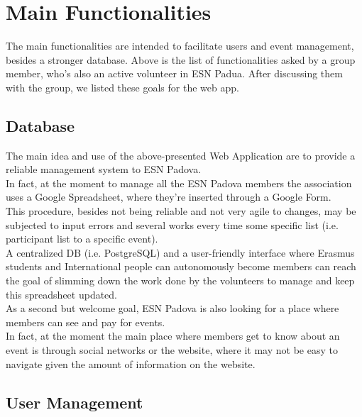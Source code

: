 \section{Main Functionalities}

The main functionalities are intended to facilitate users and event management, besides a stronger database.
Above is the list of functionalities asked by a group member, who's also an active volunteer in ESN Padua.
After discussing them with the group, we listed these goals for the web app.

\subsection{Database}
The main idea and use of the above-presented Web Application are to provide a reliable management system to ESN Padova. \\
In fact, at the moment to manage all the ESN Padova members the association uses a Google Spreadsheet, where they're inserted 
through a Google Form. \\
This procedure, besides not being reliable and not very agile to changes, may be subjected to input errors and several works 
every time some specific list (i.e. participant list to a specific event).\\
A centralized DB (i.e. PostgreSQL) and a user-friendly interface where Erasmus students and International people can autonomously 
become members can reach the goal of slimming down the work done by the volunteers to manage and keep this spreadsheet updated.\\
As a second but welcome goal, ESN Padova is also looking for a place where members can see and pay for events.\\
In fact, at the moment the main place where members get to know about an event is through social networks or the website, where it
may not be easy to navigate given the amount of information on the website.
\subsection{User Management}

